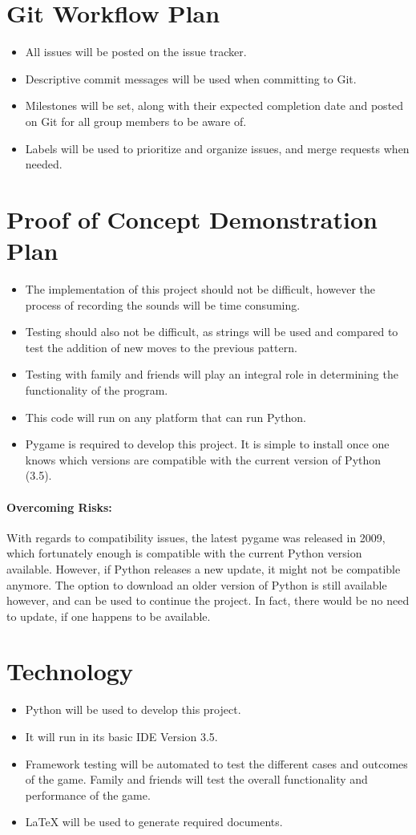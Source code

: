 \documentclass{article}
\begin{document}
\section{Git Workflow Plan}
\begin{itemize}
\item All issues will be posted on the issue tracker.
\item Descriptive commit messages will be used when committing to Git. 
\item Milestones will be set, along with their expected completion date and posted on Git for all group members to be aware of.
\item Labels will be used to prioritize and organize issues, and merge requests when needed.
\end{itemize}
\section{Proof of Concept Demonstration Plan}
\begin{itemize}
\item The implementation of this project should not be difficult, however the process of recording the sounds will be time consuming.
\item Testing should also not be difficult, as strings will be used and compared to test the addition of new moves to the previous pattern.
\item Testing with family and friends will play an integral role in determining the functionality of the program.
\item This code will run on any platform that can run Python.
\item Pygame is required to develop this project. It is simple to install once one knows which versions are compatible with the current version of Python (3.5).
\end{itemize}
\paragraph{Overcoming Risks:}
With regards to compatibility issues, the latest pygame was released in 2009, which fortunately enough is compatible with the current Python version available. However, if Python releases a new update, it might not be compatible anymore. The option to download an older version of Python is still available however, and can be used to continue the project. In fact, there would be no need to update, if one happens to be available.
\section{Technology}
\begin{itemize}
\item Python will be used to develop this project.
\item It will run in its basic IDE Version 3.5.
\item Framework testing will be automated to test the different cases and outcomes of the game. Family and friends will test the overall functionality and performance of the game.
\item LaTeX will be used to generate required documents.
\end{itemize}
\end{document}
